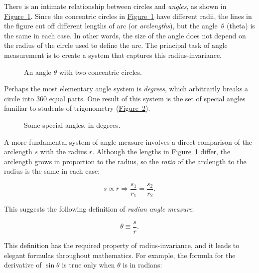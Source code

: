 \documentclass{article}
\begin{document}
There is an intimate relationship between circles and \emph{angles}, as shown in \hyperref[fig:angle-arclength]{Figure~}\ref{fig:angle-arclength}. Since the concentric circles in \hyperref[fig:angle-arclength]{Figure~}\ref{fig:angle-arclength} have different radii, the lines in the figure cut off different lengths of arc (or \emph{arclengths}), but the angle~$\theta$ (theta) is the same in each case. In other words, the size of the angle does not depend on the radius of the circle used to define the arc. The principal task of angle measurement is to create a system that captures this radius-invariance.

\begin{figure}
\begin{center}
\end{center}
\caption{An angle $\theta$ with two concentric circles.\label{fig:angle-arclength}}
\end{figure}

Perhaps the most elementary angle system is \emph{degrees}, which arbitrarily breaks a circle into 360 equal parts. One result of this system is the set of special angles familiar to students of trigonometry (\hyperref[fig:degree-angles]{Figure~}\ref{fig:degree-angles}). 

\begin{figure}
\begin{center}
\end{center}
\caption{Some special angles, in degrees.\label{fig:degree-angles}}
\end{figure}

A more fundamental system of angle measure involves a direct comparison of the arclength $s$ with the radius $r$. Although the lengths in \hyperref[fig:angle-arclength]{Figure~}\ref{fig:angle-arclength} differ, the arclength grows in proportion to the radius, so the \emph{ratio} of the arclength to the radius is the same in each case:

\[
s\propto r \Rightarrow \frac{s_1}{r_1} = \frac{s_2}{r_2}.
\]

\noindent This suggests the following definition of \emph{radian angle measure}:

\[ \theta \equiv \frac{s}{r}. \]

\noindent This definition has the required property of radius-invariance, and it leads to elegant formulas throughout mathematics. For example, the formula for the derivative of $\sin\theta$ is true only when $\theta$ is in radians:
\end{document}
